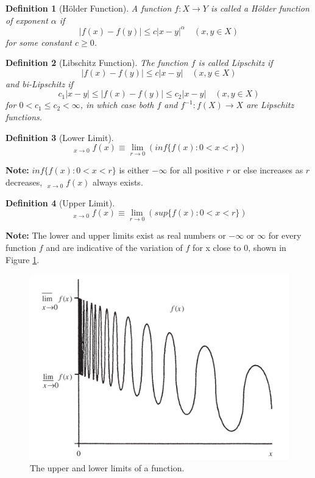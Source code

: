 \documentclass[12pt, a4paper]{article}
\DeclareMathOperator*\lowlim{\underline{lim}}
\DeclareMathOperator*\uplim{\overline{lim}}
\newtheorem{definition}{Definition}[subsection]
\begin{document}
\begin{definition}[Hölder Function]
    A function $f: X \rightarrow Y$ is called a Hölder function of exponent $\alpha$ if
$$
|f(x)-f(y)| \leq c|x-y|^{\alpha} \quad(x, y \in X)
$$
    for some constant $c\geq 0$.
\end{definition}

\begin{definition}[Libschitz Function]
    The function $f$ is called Lipschitz if
    $$
    |f(x)-f(y)| \leq c|x-y| \quad(x, y \in X)
    $$
    and bi-Lipschitz if 
    $$
    c_{1}|x-y| \leq |f(x)-f(y)| \leq c_{2}|x-y| \quad(x, y \in X)
    $$
    for $0<c_{1} \leq c_{2}<\infty$, in which case both $f$ and 
    $f^{-1}: f(X) \rightarrow X$ are Lipschitz functions.     
\end{definition}

\begin{definition}[Lower Limit]
    $$\displaystyle \lowlim_{x \to 0} f(x) \equiv \lim_{r\to 0}(inf\{f(x):0<x<r\})$$
\end{definition}

\textbf{Note:} $inf\{f(x):0<x<r\}$ is either $-\infty$ for all positive $r$ or else increases as $r$ decreases, 
$\lowlim_{x \to 0} f(x)$ always exists.

\begin{definition}[Upper Limit]
    $$\displaystyle \uplim_{x \to 0} f(x) \equiv  \lim_{r\to 0}(sup\{f(x):0<x<r\})$$
\end{definition}

\textbf{Note:} The lower and upper limits exist as real numbers or $-\infty$ or $\infty$ for 
every function $f$ and are indicative of the variation of $f$ for x close to 0, shown in Figure \ref{fig:lowerupperlimit}.

\begin{figure}[H]
    \centering
    \includegraphics[width=.66\textwidth]{images/limit1.png}
    \caption{The upper and lower limits of a function.}
    \label{fig:lowerupperlimit}
\end{figure}
\end{document}
